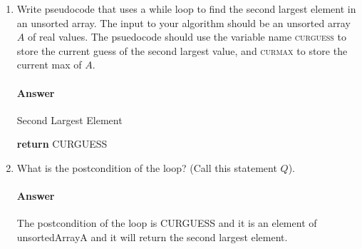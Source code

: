\documentclass{article}
\begin{document}
\begin{enumerate}

    \item Write pseudocode that uses a while loop to find the second largest
        element in an unsorted array.  The input to your algorithm should be an
        unsorted array $A$ of real values.  The psuedocode should use the
        variable name \textsc{curguess} to store the current guess of the second
        largest value, and \textsc{curmax} to store the current max of $A$.

        \paragraph{Answer}

        \begin{algorithm}
        	\caption{Second Largest Element}
        	\begin{algorithmic}[1]
                                 
                               
                               

               
                \EndIf

                \EndIf
              \EndWhile
              \Else
                \State \textbf{return} CURGUESS   
        	\end{algorithmic}
        \end{algorithm}

    \item What is the postcondition of the loop? (Call this statement $Q$).

        \paragraph{Answer}
        The postcondition of the loop is CURGUESS and it is an element of unsortedArrayA
        and it will return the second largest element.


\end{enumerate}
\end{document}
